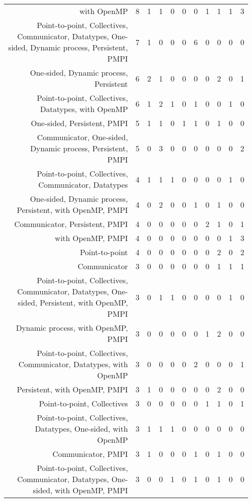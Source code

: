 {\begin{landscape}
\begin{longtable}[htb]{r|c|c|c|c|c|c|c|c|c|c}
{with OpenMP} & 8 & 1 & 1 & 0 & 0 & 0 & 1 & 1 & 1 & 3 \\%
{Point-to-point, Collectives, Communicator, Datatypes, One-sided, Dynamic process, Persistent, PMPI} & 7 & 1 & 0 & 0 & 0 & 6 & 0 & 0 & 0 & 0 \\%
{One-sided, Dynamic process, Persistent} & 6 & 2 & 1 & 0 & 0 & 0 & 0 & 2 & 0 & 1 \\%
{Point-to-point, Collectives, Datatypes, with OpenMP} & 6 & 1 & 2 & 1 & 0 & 1 & 0 & 0 & 1 & 0 \\%
{One-sided, Persistent, PMPI} & 5 & 1 & 1 & 0 & 1 & 1 & 0 & 1 & 0 & 0 \\%
{Communicator, One-sided, Dynamic process, Persistent, PMPI} & 5 & 0 & 3 & 0 & 0 & 0 & 0 & 0 & 0 & 2 \\%
{Point-to-point, Collectives, Communicator, Datatypes} & 4 & 1 & 1 & 1 & 0 & 0 & 0 & 0 & 1 & 0 \\%
{One-sided, Dynamic process, Persistent, with OpenMP, PMPI} & 4 & 0 & 2 & 0 & 0 & 1 & 0 & 1 & 0 & 0 \\%
{Communicator, Persistent, PMPI} & 4 & 0 & 0 & 0 & 0 & 0 & 2 & 1 & 0 & 1 \\%
{with OpenMP, PMPI} & 4 & 0 & 0 & 0 & 0 & 0 & 0 & 0 & 1 & 3 \\%
{Point-to-point} & 4 & 0 & 0 & 0 & 0 & 0 & 0 & 2 & 0 & 2 \\%
{Communicator} & 3 & 0 & 0 & 0 & 0 & 0 & 0 & 1 & 1 & 1 \\%
{Point-to-point, Collectives, Communicator, Datatypes, One-sided, Persistent, with OpenMP, PMPI} & 3 & 0 & 1 & 1 & 0 & 0 & 0 & 0 & 1 & 0 \\%
{Dynamic process, with OpenMP, PMPI} & 3 & 0 & 0 & 0 & 0 & 0 & 1 & 2 & 0 & 0 \\%
{Point-to-point, Collectives, Communicator, Datatypes, with OpenMP} & 3 & 0 & 0 & 0 & 0 & 2 & 0 & 0 & 0 & 1 \\%
{Persistent, with OpenMP, PMPI} & 3 & 1 & 0 & 0 & 0 & 0 & 0 & 2 & 0 & 0 \\%
{Point-to-point, Collectives} & 3 & 0 & 0 & 0 & 0 & 0 & 1 & 1 & 0 & 1 \\%
{Point-to-point, Collectives, Datatypes, One-sided, with OpenMP} & 3 & 1 & 1 & 1 & 0 & 0 & 0 & 0 & 0 & 0 \\%
{Communicator, PMPI} & 3 & 1 & 0 & 0 & 0 & 1 & 0 & 1 & 0 & 0 \\%
{Point-to-point, Collectives, Communicator, Datatypes, One-sided, with OpenMP, PMPI} & 3 & 0 & 0 & 1 & 0 & 1 & 0 & 1 & 0 & 0 \\%

\end{longtable}
\end{landscape}}
